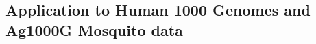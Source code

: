 \documentclass{article}
\newcommand{\cxtkit}{\texttt{cxt}\xspace}
\let\citep\parencite
\newcommand{\stdpopsim}{\texttt{stdpopsim}\xspace}
\newcommand{\singer}{\texttt{Singer}\xspace}
\newcommand{\smcpp}{\texttt{SMC++}\xspace}
\begin{document}

\subsection*{Application to Human 1000 Genomes and Ag1000G Mosquito data}
\end{document}

